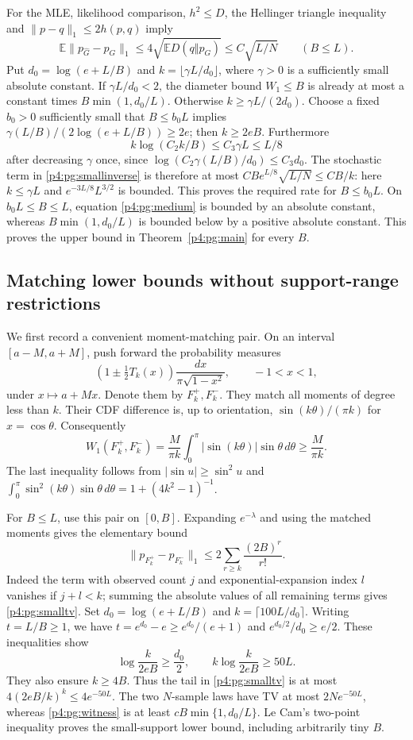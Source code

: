 \documentclass[11pt,a4paper]{article}
\theoremstyle{definition}
\theoremstyle{remark}
\numberwithin{equation}{section}
\begin{document}
For the MLE, likelihood comparison, $h^2\le D$, the Hellinger
triangle inequality and $\|p-q\|_1\le2h(p,q)$ imply
\[
 \mathbb E\|p_{\widehat G}-p_G\|_1
              \le4\sqrt{\mathbb E D(q\Vert p_G)}
              \le C\sqrt{L/N}\qquad(B\le L).
\]
Put $d_0=\log(e+L/B)$ and $k=\lfloor\gamma L/d_0\rfloor$,
where $\gamma>0$ is a sufficiently small absolute constant.
If $\gamma L/d_0<2$, the diameter bound $W_1\le B$ is already at
most a constant times $B\min(1,d_0/L)$.  Otherwise
$k\ge\gamma L/(2d_0)$.  Choose a fixed $b_0>0$ sufficiently small
that $B\le b_0L$ implies
$\gamma(L/B)/(2\log(e+L/B))\ge2e$; then $k\ge2eB$.
Furthermore
\[
 k\log(C_2k/B)\le C_3\gamma L\le L/8
\]
after decreasing $\gamma$ once, since
$\log(C_2\gamma(L/B)/d_0)\le C_3d_0$.
The stochastic term in \eqref{p4:pg:smallinverse} is therefore at most
$CB e^{L/8}\sqrt{L/N}\le CB/k$: here $k\le\gamma L$ and
$e^{-3L/8}L^{3/2}$ is bounded.  This proves the required rate for
$B\le b_0L$.  On $b_0L\le B\le L$, equation \eqref{p4:pg:medium}
is bounded by an absolute constant, whereas
$B\min(1,d_0/L)$ is bounded below by a positive absolute constant.
This proves the upper bound in Theorem~\ref{p4:pg:main} for every $B$.

\subsection{Matching lower bounds without support-range restrictions}

We first record a convenient moment-matching pair.  On an interval
$[a-M,a+M]$, push forward the probability measures
\[
 (1\pm\tfrac12T_k(x))\frac{dx}{\pi\sqrt{1-x^2}},\qquad -1<x<1,
\]
under $x\mapsto a+Mx$.  Denote them by $F_k^+,F_k^-$.
They match all moments of degree less than $k$.  Their CDF difference
is, up to orientation, $\sin(k\theta)/(\pi k)$ for $x=\cos\theta$.
Consequently
\begin{equation}\label{p4:pg:witness}
 W_1(F_k^+,F_k^-)
   =\frac M{\pi k}\int_0^\pi|\sin(k\theta)|\sin\theta\,d\theta
   \ge\frac M{\pi k}.
\end{equation}
The last inequality follows from $|\sin u|\ge\sin^2u$ and
$\int_0^\pi\sin^2(k\theta)\sin\theta\,d\theta
=1+(4k^2-1)^{-1}$.

For $B\le L$, use this pair on $[0,B]$.  Expanding $e^{-\lambda}$
and using the matched moments gives the elementary bound
\begin{equation}\label{p4:pg:smalltv}
 \|p_{F_k^+}-p_{F_k^-}\|_1
 \le2\sum_{r\ge k}\frac{(2B)^r}{r!}.
\end{equation}
Indeed the term with observed count $j$ and exponential-expansion
index $l$ vanishes if $j+l<k$; summing the absolute values of all
remaining terms gives \eqref{p4:pg:smalltv}.
Set $d_0=\log(e+L/B)$ and $k=\lceil100L/d_0\rceil$.
Writing $t=L/B\ge1$, we have
$t=e^{d_0}-e\ge e^{d_0}/(e+1)$ and
$e^{d_0/2}/d_0\ge e/2$.  These inequalities show
\[
 \log\frac{k}{2eB}\ge\frac{d_0}2,
 \qquad k\log\frac{k}{2eB}\ge50L.
\]
They also ensure $k\ge4B$.  Thus the tail in
\eqref{p4:pg:smalltv} is at most $4(2eB/k)^k\le4e^{-50L}$.
The two $N$-sample laws have TV at most $2Ne^{-50L}$, whereas
\eqref{p4:pg:witness} is at least
$cB\min\{1,d_0/L\}$.  Le Cam's two-point inequality proves the
small-support lower bound, including arbitrarily tiny $B$.
\end{document}
